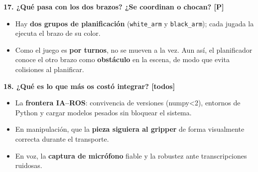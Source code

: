 \documentclass[11pt]{article}
\begin{document}
\textbf{17. ¿Qué pasa con los dos brazos? ¿Se coordinan o chocan? [P]}
\begin{itemize}
    \item Hay \textbf{dos grupos de planificación} (\texttt{white\_arm} y
          \texttt{black\_arm}); cada jugada la ejecuta el brazo de su color.
    \item Como el juego es \textbf{por turnos}, no se mueven a la vez. Aun así,
          el planificador conoce el otro brazo como \textbf{obstáculo} en la
          escena, de modo que evita colisiones al planificar.
\end{itemize}

\textbf{18. ¿Qué es lo que más os costó integrar? [todos]}
\begin{itemize}
    \item La \textbf{frontera IA--ROS}: convivencia de versiones (numpy<2),
          entornos de Python y cargar modelos pesados sin bloquear el sistema.
    \item En manipulación, que la \textbf{pieza siguiera al gripper} de forma
          visualmente correcta durante el transporte.
    \item En voz, la \textbf{captura de micrófono} fiable y la robustez ante
          transcripciones ruidosas.
\end{itemize}
\end{document}
